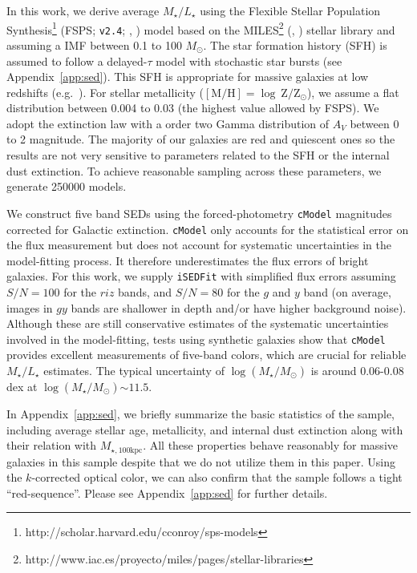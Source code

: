 \documentclass[a4paper,fleqn,usenatbib]{mnras}
\def\msun{$M_\odot$}
\def\cmodel{\texttt{cModel}}
\def\logms{{$\log (M_{\star}/M_{\odot})$}}
\def\mtot{{$M_{\star,100\mathrm{kpc}}$}}
\def\m2l{{$M_{\star}/L_{\star}$}}
\begin{document}
    In this work, we derive average \m2l{} using the Flexible Stellar Population 
    Synthesis\footnote{http://scholar.harvard.edu/cconroy/sps-models}
    (FSPS; \texttt{v2.4}; \citealt{FSPS}, \citealt{Conroy2010}) model based on the 
    MILES\footnote{http://www.iac.es/proyecto/miles/pages/stellar-libraries}
    (\citealt{MILES1}, \citealt{MILES2}) stellar library and assuming a
    \citet{Chabrier2003} IMF between 0.1 to 100 \msun. 
    The star formation history (SFH) is assumed to follow a delayed-$\tau$ model with 
    stochastic star bursts (see Appendix~\ref{app:sed}). 
    This SFH is appropriate for massive galaxies at low redshifts 
    (e.g.\ \citealt{Kauffmann2003}). 
    For stellar metallicity 
    ($[\mathrm{M}/\mathrm{H}]=\log\ \mathrm{Z}/\mathrm{Z}_{\odot}$), we assume a flat 
    distribution between 0.004 to 0.03 (the highest value allowed by FSPS).
    We adopt the \citet{Calzetti2000} extinction law with a order two Gamma 
    distribution of $A_{V}$ between 0 to 2 magnitude. 
    The majority of our galaxies are red and quiescent ones so the results are not 
    very sensitive to parameters related to the SFH or the internal dust extinction. 
    To achieve reasonable sampling across these parameters, we generate 250000 models. 
    
    We construct five band SEDs using the forced-photometry \cmodel{} magnitudes 
    corrected for Galactic extinction. 
    \cmodel{} only accounts for the statistical error on the flux measurement but 
    does not account for systematic uncertainties in the model-fitting process. 
    It therefore underestimates the flux errors of bright galaxies. 
    For this work, we supply \texttt{iSEDFit} with simplified flux errors assuming 
    $S/N = 100$ for the $riz$ bands, and $S/N = 80$ for the $g$ and $y$ band 
    (on average, images in $gy$ bands are shallower in depth and/or have higher 
    background noise).  
    Although these are still conservative estimates of the systematic uncertainties 
    involved in the model-fitting, tests using synthetic galaxies show that \cmodel{}
    provides excellent measurements of five-band colors, which are crucial for 
    reliable \m2l{} estimates.
    The typical uncertainty of \logms{} is around 0.06-0.08 dex at \logms${\sim} 11.5$.
    
    In Appendix~\ref{app:sed}, we briefly summarize the basic statistics of 
    the sample, including average stellar age, metallicity, and internal dust 
    extinction along with their relation with \mtot{}. 
    All these properties behave reasonably for massive galaxies in this sample despite 
    that we do not utilize them in this paper. 
    Using the $k$-corrected optical color, we can also confirm that the sample follows 
    a tight ``red-sequence''.  
    Please see Appendix~\ref{app:sed} for further details.
      
\end{document}
